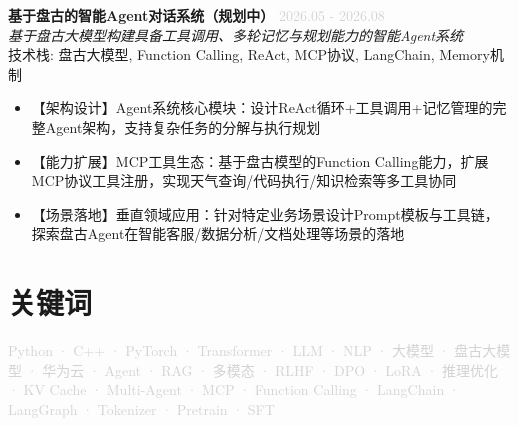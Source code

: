 \documentclass[11pt,a4paper]{article}
\begin{document}
\noindent\textbf{基于盘古的智能Agent对话系统（规划中）} \hfill \textcolor{lightgray}{2026.05 - 2026.08}\\
\textit{基于盘古大模型构建具备工具调用、多轮记忆与规划能力的智能Agent系统}\\
技术栈: 盘古大模型, Function Calling, ReAct, MCP协议, LangChain, Memory机制
\begin{itemize}

  \item 【架构设计】Agent系统核心模块：设计ReAct循环+工具调用+记忆管理的完整Agent架构，支持复杂任务的分解与执行规划

  \item 【能力扩展】MCP工具生态：基于盘古模型的Function Calling能力，扩展MCP协议工具注册，实现天气查询/代码执行/知识检索等多工具协同

  \item 【场景落地】垂直领域应用：针对特定业务场景设计Prompt模板与工具链，探索盘古Agent在智能客服/数据分析/文档处理等场景的落地

\end{itemize}




\section{关键词}
\textcolor{lightgray}{\small Python · C++ · PyTorch · Transformer · LLM · NLP · 大模型 · 盘古大模型 · 华为云 · Agent · RAG · 多模态 · RLHF · DPO · LoRA · 推理优化 · KV Cache · Multi-Agent · MCP · Function Calling · LangChain · LangGraph · Tokenizer · Pretrain · SFT}
\end{document}
